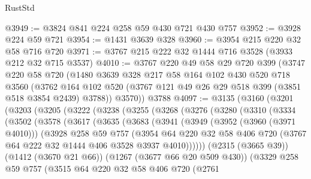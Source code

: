 \begin{lexlean}{RustStd}
\begin{coremodule}
@3949 := @3824 @841 @224 @258 @59 @430 @721 @430 @757
@3952 := @3928 @224 @59 @721
@3954 := @1431 @3639 @328
@3960 := @3954 @215 @220 @32 @58 @716 @720
@3971 := @3767 @215 @222 @32 @1444 @716 @3528 (@3933 @212 @32 @715 @3537)
@4010 := @3767
    @220
    @49
    @58
    @29
    @720
    @399
    (@3747
      @220
      @58
      @720
      (@1480
        @3639
        @328
        @217
        @58
        @164
        @102
        @430
        @520
        @718
        @3560
        (@3762 @164 @102 @520 (@3767 @121 @49 @26 @29 @518 @399 (@3851 @518 @3854 @2439) @3788))
        @3570))
    @3788
@4097 := @3135
    (@3160
      (@3201
        (@3203
          (@3205
            (@3222
              (@3238
                (@3255
                  (@3268
                    (@3276
                      (@3280
                        (@3310
                          (@3334
                            (@3502
                              (@3578
                                (@3617
                                  (@3635
                                    (@3683
                                      (@3941
                                        (@3949
                                          (@3952 (@3960 (@3971 @4010)))
                                          (@3928
                                            @258
                                            @59
                                            @757
                                            (@3954
                                              @64
                                              @220
                                              @32
                                              @58
                                              @406
                                              @720
                                              (@3767 @64 @222 @32 @1444 @406 @3528 @3937 @4010))))))
                                    (@2315 (@3665 @39))
                                    (@1412 (@3670 @21 @66))
                                    (@1267 (@3677 @66 @20 @509 @430))
                                    (@3329
                                      @258
                                      @59
                                      @757
                                      (@3515
                                        @64
                                        @220
                                        @32
                                        @58
                                        @406
                                        @720
                                        (@2761

\end{coremodule}
\end{lexlean}
